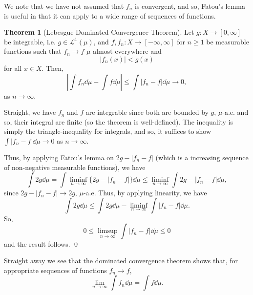 \documentclass[
]{article}
\theoremstyle{definition}
\newtheorem{theorem}{Theorem}
\theoremstyle{definition}
\begin{document}
We note that we have not assumed that \(f_n\) is convergent, and so,
Fatou's lemma is useful in that it can apply to a wide range of
sequences of functions.

\begin{theorem}[Lebesgue Dominated Convergence Theorem]
  Let \(g : X \to [0, \infty]\) be integrable, i.e. \(g \in \mathcal{L}^1(\mu)\), 
  and \(f, f_n : X \to [- \infty, \infty]\) for \(n \ge 1\) be measurable functions 
  such that \(f_n \to f\) \(\mu\)-almost everywhere and 
  \[| f_n(x) | < g(x)\]
  for all \(x \in X\). Then, 
  \[\left| \int f_n \dd \mu - \int f \dd \mu \right| \le \int |f_n - f| \dd \mu \to 0,\]
  as \(n \to \infty\).
\end{theorem}
\proof

Straight, we have \(f_n\) and \(f\) are integrable since both are
bounded by \(g\), \(\mu\)-a.e. and so, their integral are finite (so the
theorem is well-defined). The inequality is simply the
triangle-inequality for integrals, and so, it suffices to show
\(\int |f_n - f| \dd \mu \to 0\) as \(n \to \infty\).

Thus, by applying Fatou's lemma on \(2g - |f_n - f|\) (which is a
increasing sequence of non-negative measurable functions), we have
\[\int 2g \dd \mu = \int \liminf_{n \to \infty} \{2g - |f_n - f|\} \dd \mu \le \liminf_{n \to \infty} 
    \int 2g - |f_n - f| \dd \mu, \] since \(2g - |f_n - f| \to 2g\),
\(\mu\)-a.e. Thus, by applying linearity, we have
\[\int 2g \dd \mu \le \int 2g \dd \mu - \liminf_{n \to \infty} \int |f_n - f| \dd \mu.\]
So, \[0 \le \limsup_{n \to \infty} \int |f_n - f| \dd \mu \le 0\] and
the result follows. \qed

Straight away we see that the dominated convergence theorem shows that,
for appropriate sequences of functions \(f_n \to f\),
\[\lim_{n \to \infty} \int f_n \dd \mu = \int f \dd \mu.\]
\end{document}
